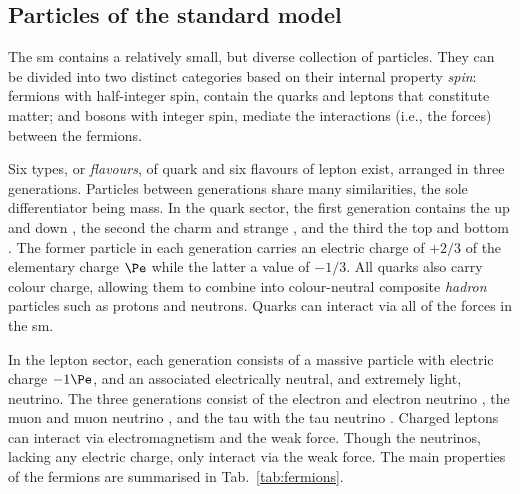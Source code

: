 

\subsection{Particles of the standard model}
\label{subsec:theory_sm_particles}

The \acrlong{sm} contains a relatively small, but diverse collection of particles. They can be divided into two distinct categories based on their internal property \emph{spin}: fermions with half-integer spin, contain the quarks and leptons that constitute matter; and bosons with integer spin, mediate the interactions (i.e., the forces) between the fermions.

Six types, or \emph{flavours}, of quark and six flavours of lepton exist, arranged in three generations. Particles between generations share many similarities, the sole differentiator being mass. In the quark sector, the first generation contains the up \Pup and down \Pdown, the second the charm \Pcharm and strange \Pstrange, and the third the top \Ptop and bottom \Pbottom. The former particle in each generation carries an electric charge of $+\text{2/3}$ of the elementary charge $\Pe$ while the latter a value of $-\text{1/3}$. All quarks also carry colour charge, allowing them to combine into colour-neutral composite \emph{hadron} particles such as protons and neutrons. Quarks can interact via all of the forces in the \acrlong{sm}.

In the lepton sector, each generation consists of a massive particle with electric charge $-\text{1}\Pe$, and an associated electrically neutral, and extremely light, neutrino. The three generations consist of the electron \Pe and electron neutrino \Pnue, the muon \Pmu and muon neutrino \Pnum, and the tau \Ptau with the tau neutrino \Pnut. Charged leptons can interact via electromagnetism and the weak force. Though the neutrinos, lacking any electric charge, only interact via the weak force. The main properties of the fermions are summarised in Tab.~\ref{tab:fermions}.

